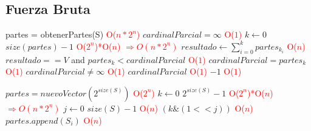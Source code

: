 \subsection{Fuerza Bruta}


\begin{codebox}
    \li partes = obtenerPartes(S) \textcolor{red}{O($n*2^n$)}
    \li $cardinalParcial = \infty$ \textcolor{red}{O($1$)}
    \li \For $k \gets 0$ \To $size(partes) - 1$ \textcolor{red}{O($2^n$)*O($n$) $\Rightarrow O(n* 2^n)$}
        \Do
    \li $resultado \gets \sum_{i=0}^{k} partes_{k_i}$ \textcolor{red}{O($n$)}
    \li \If $resultado == V$ and $partes_k < cardinalParcial$ \textcolor{red}{O($1$)}
            \Then
    \li         $cardinalParcial = partes_k$ \textcolor{red}{O($1$)}
    \li 
        \End
    \li \If $cardinalParcial \neq \infty$ \textcolor{red}{O($1$)}
        \Then
    \li     \Return $cardinalParcial$ \textcolor{red}{O($1$)}
    \li \Else 
    \li     \Return $-1$ \textcolor{red}{O($1$)}

    \end{codebox}

\begin{codebox}
    \li $partes = nuevoVector(2^{size(S)})$ \textcolor{red}{O($2^n$)}
    \li \For $k \gets 0$ \To $2^{size(S)} - 1$ \textcolor{red}{O($2^n$)*O($n$) $\Rightarrow O(n* 2^n)$}
        \Do
    \li     \For $j \gets 0$ \To $size(S) - 1$ \textcolor{red}{O($n$)}
            \Do
    \li         \If $(k \& (1<<j))$   \textcolor{red}{O($n$)}
                   \Then
    \li                 $partes.append(S_i)$ \textcolor{red}{O($n$)}
            
\end{codebox}